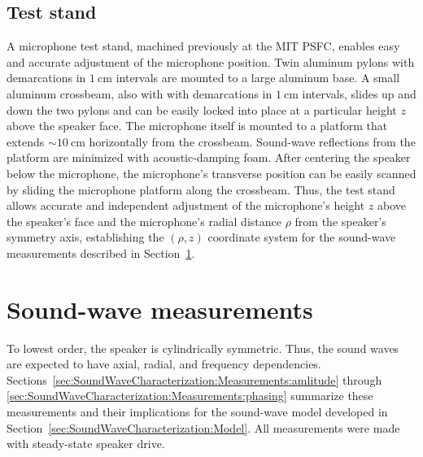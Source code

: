 \subsection{Test stand}
\label{sec:SoundWaveCharacterization:Hardware:test_stand}
A microphone test stand, machined previously at the MIT PSFC,
enables easy and accurate adjustment of the microphone position.
Twin aluminum pylons with demarcations in $\SI{1}{\centi\meter}$ intervals
are mounted to a large aluminum base.
A small aluminum crossbeam,
also with with demarcations in $\SI{1}{\centi\meter}$ intervals,
slides up and down the two pylons and can be easily locked into place
at a particular height $z$ above the speaker face.
The microphone itself is mounted to a platform
that extends $\sim\SI{10}{\centi\meter}$ horizontally
from the crossbeam.
Sound-wave reflections from the platform are minimized
with acoustic-damping foam.
After centering the speaker below the microphone,
the microphone's transverse position can be easily scanned
by sliding the microphone platform along the crossbeam.
Thus, the test stand allows accurate and independent adjustment of
the microphone's height $z$ above the speaker's face and
the microphone's radial distance $\rho$ from the speaker's symmetry axis,
establishing the $(\rho, z)$ coordinate system
for the sound-wave measurements described in
Section~\ref{sec:SoundWaveCharacterization:Measurements}.


\section{Sound-wave measurements}
\label{sec:SoundWaveCharacterization:Measurements}
To lowest order, the speaker is cylindrically symmetric.
Thus, the sound waves are expected to have
axial, radial, and frequency dependencies.
Sections~\ref{sec:SoundWaveCharacterization:Measurements:amlitude} through
\ref{sec:SoundWaveCharacterization:Measurements:phasing}
summarize these measurements and their implications
for the sound-wave model developed in
Section~\ref{sec:SoundWaveCharacterization:Model}.
All measurements were made with steady-state speaker drive.


